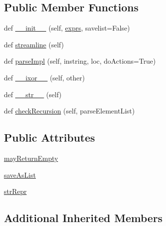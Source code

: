 \subsection*{Public Member Functions}
\begin{DoxyCompactItemize}
\item 
def \hyperlink{classpip_1_1__vendor_1_1pyparsing_1_1Or_aaaa9f1d796252b37fe1450d8e571ffd5}{\+\_\+\+\_\+init\+\_\+\+\_\+} (self, \hyperlink{classpip_1_1__vendor_1_1pyparsing_1_1ParseExpression_a55b67003a1a014d5897ce2478411e75a}{exprs}, savelist=False)
\item 
def \hyperlink{classpip_1_1__vendor_1_1pyparsing_1_1Or_a51a8f5f7132da9c0b90fe99a8196fb55}{streamline} (self)
\item 
def \hyperlink{classpip_1_1__vendor_1_1pyparsing_1_1Or_a77df7fb95a8664cb260c5fee1b12558f}{parse\+Impl} (self, instring, loc, do\+Actions=True)
\item 
def \hyperlink{classpip_1_1__vendor_1_1pyparsing_1_1Or_aaf839e2959fe88953c3026226a1c9e99}{\+\_\+\+\_\+ixor\+\_\+\+\_\+} (self, other)
\item 
def \hyperlink{classpip_1_1__vendor_1_1pyparsing_1_1Or_a5010a1e1c31603501f014876ee560278}{\+\_\+\+\_\+str\+\_\+\+\_\+} (self)
\item 
def \hyperlink{classpip_1_1__vendor_1_1pyparsing_1_1Or_a2410615b409f32350f28a0be86eb6305}{check\+Recursion} (self, parse\+Element\+List)
\end{DoxyCompactItemize}
\subsection*{Public Attributes}
\begin{DoxyCompactItemize}
\item 
\hyperlink{classpip_1_1__vendor_1_1pyparsing_1_1Or_a7acb05e29471d06bf48f6d3af9448e43}{may\+Return\+Empty}
\item 
\hyperlink{classpip_1_1__vendor_1_1pyparsing_1_1Or_aacd052d88ff05a5610dd1d42de2a8fd5}{save\+As\+List}
\item 
\hyperlink{classpip_1_1__vendor_1_1pyparsing_1_1Or_a0df9ee8b96ba5de3f7e7f2035aa41a83}{str\+Repr}
\end{DoxyCompactItemize}
\subsection*{Additional Inherited Members}


